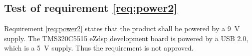 \subsection{Test of requirement \autoref{req:power2}}
Requirement \autoref{req:power2} states that the product shall be powered by a \SI{9}{\volt} supply. The TMS320C5515 eZdsp development board is powered by a USB 2.0, which is a \SI{5}{\volt} supply. Thus the requirement is not approved.
